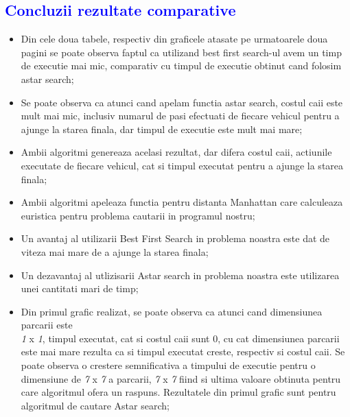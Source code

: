 \documentclass{article}
\begin{document}
\begin{flushleft}
\newpage
\textcolor{blue}{\subsection{\textcolor{blue}{Concluzii rezultate comparative}}}
\vspace{10mm}
\begin{itemize}
    \item Din cele doua tabele, respectiv din graficele atasate pe urmatoarele doua pagini se poate observa faptul ca utilizand best first search-ul avem un timp de executie mai mic, comparativ cu timpul de executie obtinut cand folosim astar search;
    \newline 
    \item Se poate observa ca atunci cand apelam functia astar search, costul caii este mult mai mic, inclusiv numarul de pasi efectuati de fiecare vehicul pentru a ajunge la starea finala, dar timpul de executie este mult mai mare;
    \newline
    \item Ambii algoritmi genereaza acelasi rezultat, dar difera costul caii, actiunile executate de fiecare vehicul, cat si timpul executat pentru a ajunge la starea finala;
    \item Ambii algoritmi apeleaza functia pentru distanta Manhattan care calculeaza euristica pentru problema cautarii in programul nostru;
    \newline
    \item Un avantaj al utilizarii Best First Search in problema noastra este dat de viteza mai mare de a ajunge la starea finala;
    \newline
    \item Un dezavantaj al utlizisarii Astar search in problema noastra este utilizarea unei cantitati mari de timp;
    \newline
    \item Din primul grafic realizat, se poate observa ca atunci cand dimensiunea parcarii este \\ \emph 1 x \emph 1, timpul executat, cat si costul caii sunt 0, cu cat dimensiunea parcarii este mai mare rezulta ca si timpul executat creste, respectiv si costul caii. Se poate observa o crestere semnificativa a timpului de executie pentru o dimensiune de \emph 7 x \emph 7 a parcarii, \emph 7 x \emph 7 fiind si ultima valoare obtinuta pentru care algoritmul ofera un raspuns. Rezultatele din primul grafic sunt pentru algoritmul de cautare Astar search;
    \newline

\end{itemize}
\end{flushleft}
\end{document}
